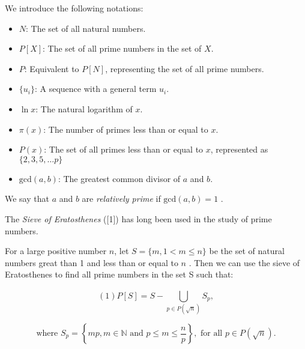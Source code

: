 \documentclass{article}
\begin{document}
We introduce the following notations:

\begin{itemize}
    \item \( N \): The set of all natural numbers.
    \item \( P[X] \): The set of all prime numbers in the set of \( X \).
    \item \( P \): Equivalent to \( P[N] \), representing the set of all prime numbers.
    \item \( \{ u_{i} \} \): A sequence with a general term \( u_{i} \).
    \item \( \ln x \): The natural logarithm of \( x \).
    \item \( \pi (x) \): The number of primes less than or equal to \( x \).
    \item \( P(x) \): The set of all primes less than or equal to \( x \), represented as \( \{ 2,3,5,\ldots p \} \)
    \item \( \text{gcd}(a,b) \): The greatest common divisor of \( a \) and \( b \).

\end{itemize}

\vspace{1\baselineskip}

We say that \( a \) and \( b \) are \textit{relatively prime} if \( \text{gcd}(a,b) = 1 \) \cite{2}.


\begin{flushleft}
The  {\textit{Sieve of Eratosthenes} }([1]) has long been used in the study of prime numbers. 
\end{flushleft}


For a large positive number \( n\), let \( S = \{ m,  1<m\leq n\}\) { } be the set of natural numbers great than 1 and less than or equal to \( n\) {.  Then we can use the sieve of Eratosthenes to find all prime numbers in the set }S such that:

\begin{equation}
    (1)                              P\left[S\right] =  S- \bigcup_{p\in P\left(\sqrt{n}\right)}^{} S_{p}  ,
\end{equation}

\begin{equation}
\text{where } S_{p} = \left\{ mp, m \in \mathbb{N} \text{ and } p \leq m \leq \frac{n}{p} \right\} , \text{ for all } p \in P(\sqrt{n}).
\end{equation}


\vspace{1\baselineskip}
\end{document}
